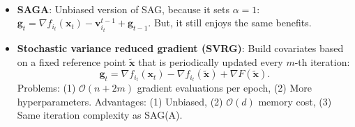 \documentclass[8pt,a4paper]{extarticle}
\newcommand{\lft}{\mathopen{}\mathclose\bgroup\left}
\newcommand{\rgt}{\aftergroup\egroup\right}
\newcommand{\E}{\mathbb{E}}
\renewcommand{\vec}[1]{\bm{#1}}
\newenvironment{topic}[1]
{\textbf{\sffamily \colorbox{black}{\rlap{\textbf{\textcolor{white}{#1}}}\hspace{\linewidth}\hspace{-2\fboxsep}}} \\ \vspace{0.2cm}}
{}
\begin{document}
\begin{multicols*}{2}
\begin{topic}{Variance reduction}
\begin{itemize}
\begin{itemize}
                            Each iteration we update $\vec{v}_i^t$ by \[
                                \vec{v}_i^t =
                                \begin{cases}
                                    \nabla f_{i_t}(\vec{x}_t) & i = i_t     \\
                                    \vec{v}_i^{t-1}           & i \neq i_t.
                                \end{cases}
                            \]
                            Thus, we have $\alpha=\frac{1}{n}$, $Y = \vec{v}_{i_t}^{t-1}$, and $\E[Y] = \vec{g}_{t-1}$, \[
                                \vec{g}_t = \frac{1}{n} \lft( \nabla f_{i_t}(\vec{x}_t) - \vec{v}_{i_t}^{t-1} \rgt) + \vec{g}_{t-1}.
                            \]
                            Problem: (1) $\mathcal{O}(nd)$ storage, (2) biased $\alpha \neq 1$. Advantage:
                            $\mathcal{O}((n+\kappa_{\max} \log \frac{1}{\epsilon}))$ iteration complexity, where $\kappa_{\max}
                                = \max_{i \in [n]} \frac{L_i}{\mu}$.
                      \item \textbf{SAGA}: Unbiased version of SAG, because it sets $\alpha=1$: $\vec{g}_t = \nabla f_{i_t}(\vec{x}_t) - \vec{v}_{i_t}^{t-1} + \vec{g}_{t-1}$. But, it still enjoys the same benefits.
                      \item \textbf{Stochastic variance reduced gradient (SVRG)}: Build covariates based on a fixed reference point $\tilde{\vec{x}}$ that is periodically updated every $m$-th iteration: \[
                                \vec{g}_t = \nabla f_{i_t}(\vec{x}_t) - \nabla f_{i_t}(\tilde{\vec{x}}) + \nabla F(\tilde{\vec{x}}).
                            \]
                            Problems: (1) $\mathcal{O}(n+2m)$ gradient evaluations per epoch, (2) More hyperparameters.
                            Advantages: (1) Unbiased, (2) $\mathcal{O}(d)$ memory cost, (3) Same iteration complexity as
                            SAG(A).
                  \end{itemize}
        \end{itemize}
    \end{topic}


\end{multicols*}
\end{document}
